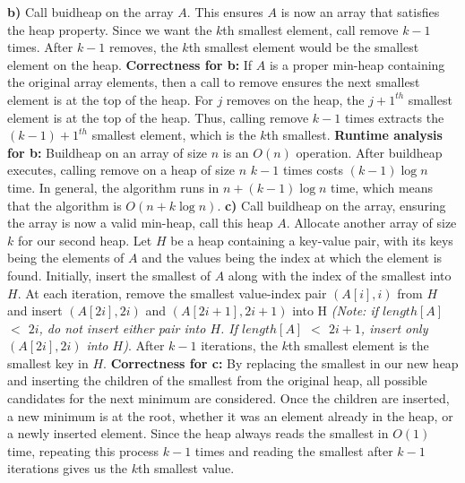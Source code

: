 \documentclass[11pt]{article}
\begin{document}
\begin{flushleft}
		\newline
		\newline
		\textbf{b)} Call buidheap on the array $A$. This ensures $A$ is now an array that satisfies the heap property. Since we want the $k$th smallest element, call remove $k - 1$ times. After $k - 1$ removes, the $k$th smallest element would be the smallest element on the heap. 
		\newline
		\textbf{Correctness for b:} If $A$ is a proper min-heap containing the original array elements, then a call to remove ensures the next smallest element is at the top of the heap. For $j$ removes on the heap, the $j + 1^{th}$ smallest element is at the top of the heap. Thus, calling remove $k - 1$ times extracts the $(k - 1) + 1^{th}$ smallest element, which is the $k$th smallest. 
		\newline
		\textbf{Runtime analysis for b:} Buildheap on an array of size $n$ is an $O(n)$ 	operation. After buildheap executes, calling remove on a heap of size $n$ $k - 1$ times costs $(k - 1) \log n$ time. In general, the algorithm runs in
		$n + (k - 1) \log n$ time, which means that the algorithm is $O(n + k \log n)$.
		\newpage
		\textbf{c)} Call buildheap on the array, ensuring the array is now a valid min-heap, call this heap $A$. Allocate another array of size $k$ for our second heap. Let $H$ be a heap containing a key-value pair, with its keys being the elements of $A$ and the values being the index at which the element is found. Initially, insert the smallest of $A$ along with the index of the smallest into $H$. At each iteration, remove the smallest value-index pair $(A[i], i)$ from $H$ and insert $(A[2i], 2i)$ and $(A[2i + 1], 2i + 1)$ into H \emph{(Note: if $length[A]$ $<$ $2i$, do not insert either pair into $H$. If $length[A]$ $<$ $2i + 1$, insert only $(A[2i], 2i)$ into $H$)}. After $k - 1$ iterations, the $k$th smallest element is the smallest key in $H$. 
		\newline
		\textbf{Correctness for c:} By replacing the smallest in our new heap and inserting the children of the smallest from the original heap, all possible candidates for the next minimum are considered. Once the children are inserted, a new minimum is at the root, whether it was an element already in the heap, or a newly inserted element. Since the heap always reads the smallest in $O(1)$ time, repeating this process $k - 1$ times and reading the smallest after $k - 1$ iterations gives us the $k$th smallest value. 
		

\end{flushleft}
\end{document}
